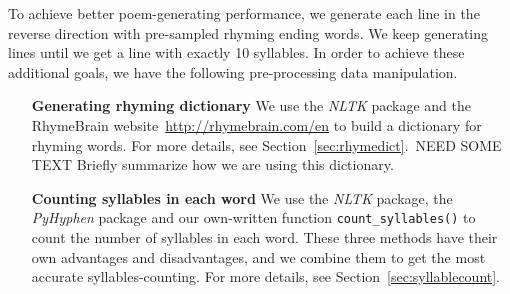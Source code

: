 To achieve better poem-generating performance, we generate each line in the reverse direction with pre-sampled rhyming ending words. We keep generating lines until we get a line with exactly 10 syllables. In order to achieve these additional goals, we have the following pre-processing data manipulation.
\begin{enumerate}
	\item [\textbf{Generating rhyming dictionary}] We use the \textit{NLTK} package and the RhymeBrain website~\url{http://rhymebrain.com/en} to build a dictionary for rhyming words. For more details, see Section~\ref{sec:rhymedict}.{\color{blue}\ NEED SOME TEXT} Briefly summarize how we are using this dictionary.
	\item [\textbf{Counting syllables in each word}] We use the \textit{NLTK} package, the \textit{PyHyphen} package and our own-written function \texttt{count\_syllables()} to count the number of syllables in each word. These three methods have their own advantages and disadvantages, and we combine them to get the most accurate syllables-counting. For more details, see Section~\ref{sec:syllablecount}.
\end{enumerate}
